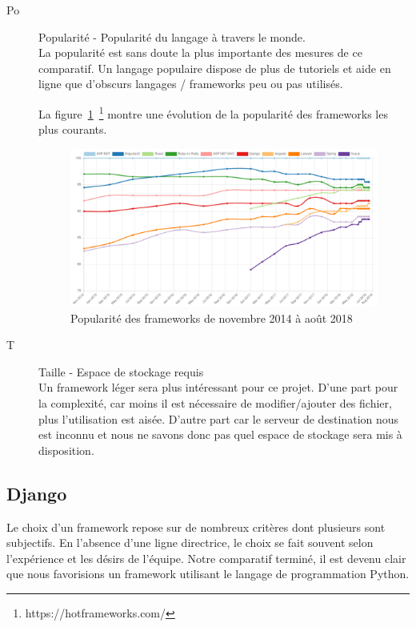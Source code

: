 \documentclass{EPL-master-thesis-covers-FR}
\begin{document}
\begin{description}
				    \item[Po] Popularité - Popularité du langage à travers le monde. \hfill \\
							La popularité est sans doute la plus importante des mesures de ce comparatif. Un langage populaire dispose de plus de tutoriels et aide en ligne que d'obscurs langages / frameworks peu ou pas utilisés.

							La figure~\ref{fig:hotframework}~\footnote{https://hotframeworks.com/} montre une évolution de la popularité des frameworks les plus courants.

							\begin{figure}
							    \centering
							    \includegraphics[width=\textwidth]{images/hotframework.png}
							    \caption{Popularité des frameworks de novembre 2014 à août 2018}
							    \label{fig:hotframework}
							\end{figure}

				    \item[T] Taille - Espace de stockage requis \hfill \\
							Un framework léger sera plus intéressant pour ce projet. D'une part pour la complexité, car moins il est nécessaire de modifier/ajouter des fichier, plus l'utilisation est aisée. D'autre part car le serveur de destination nous est inconnu et nous ne savons donc pas quel espace de stockage sera mis à disposition.
				\end{description}

				\subsection*{Django}
					Le choix d'un framework repose sur de nombreux critères dont plusieurs sont subjectifs. En l'absence d'une ligne directrice, le choix se fait souvent selon l'expérience et les désirs de l'équipe. Notre comparatif terminé, il est devenu clair que nous favorisions un framework utilisant le langage de programmation Python.
\end{document}
